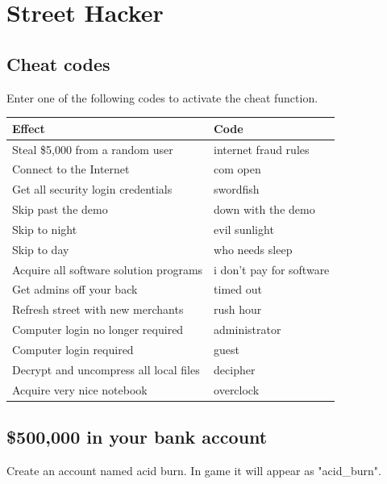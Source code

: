 \documentclass[11pt,twoside,a4paper]{book}
\begin{document}
\clearpage

\section{Street Hacker}

\subsection{Cheat codes}

Enter one of the following codes to activate the cheat function. ~\\

\begin{center}
	\begin{tabular}[ht]{ p{7.00cm} p{4.00cm} }
		Effect									&	Code						\\
		\hline
		Steal \$5,000 from a random user		&	internet fraud rules		\\
		Connect to the Internet					&	com open					\\
		Get all security login credentials		&	swordfish					\\
		Skip past the demo						&	down with the demo			\\
		Skip to night							&	evil sunlight				\\
		Skip to day								&	who needs sleep				\\
		Acquire all software solution programs	&	i don't pay for software	\\
		Get admins off your back				&	timed out					\\
		Refresh street with new merchants		&	rush hour					\\
		Computer login no longer required		&	administrator				\\
		Computer login required					&	guest						\\
		Decrypt and uncompress all local files	&	decipher					\\
		Acquire very nice notebook				&	overclock					\\
	\end{tabular}
\end{center}

\subsection{\$500,000 in your bank account}

Create an account named acid burn. In game it will appear as "acid\_burn". 
\end{document}
